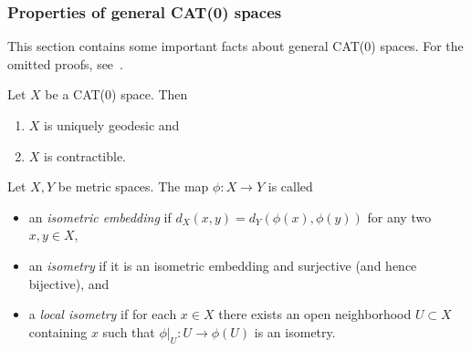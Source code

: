 
\subsubsection*{Properties of general CAT(0) spaces}

This section contains some important facts about general CAT(0) spaces. For the omitted proofs, see\ \cite{MR1744486}.

\begin{prop}[{\cite[Prop II.1.4]{MR1744486}}]
  Let \(X\) be a CAT(0) space. Then
  \begin{enumerate}
  \item \(X\) is uniquely geodesic and
  \item \(X\) is contractible.
  \end{enumerate}
\end{prop}

\begin{defin}
  Let \(X,Y\) be metric spaces. The map \(\phi \colon X \to Y\) is called
  \begin{itemize}
  \item an \emph{isometric embedding} if \(d_X(x,y) = d_Y(\phi(x), \phi(y))\) for any two \(x,y \in X\),
  \item an \emph{isometry} if it is an isometric embedding and surjective (and hence bijective), and
  \item a \emph{local isometry} if for each \(x \in X\) there exists an open neighborhood \(U \subset X\) containing \(x\) such that \(\phi|_U \colon U \to \phi(U)\) is an isometry.
  \end{itemize}
\end{defin}

